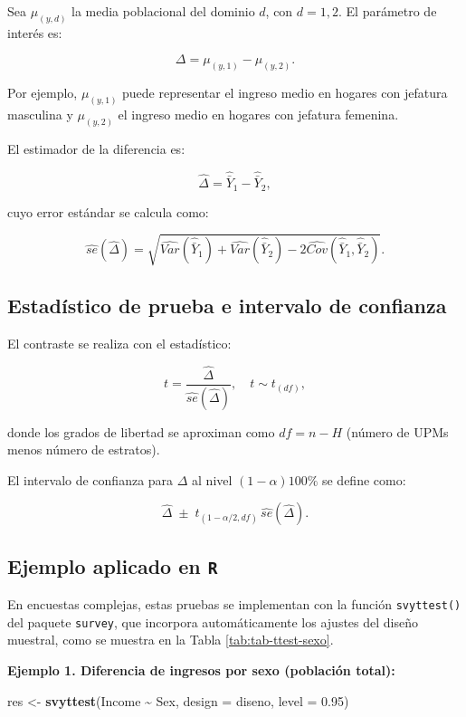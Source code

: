 \documentclass[
  spanish,
  12pt,
]{book}
\newenvironment{Shaded}{\begin{snugshade}}{\end{snugshade}}
\newcommand{\AttributeTok}[1]{\textcolor[rgb]{0.13,0.29,0.53}{#1}}
\newcommand{\FloatTok}[1]{\textcolor[rgb]{0.00,0.00,0.81}{#1}}
\newcommand{\FunctionTok}[1]{\textcolor[rgb]{0.13,0.29,0.53}{\textbf{#1}}}
\newcommand{\NormalTok}[1]{#1}
\newcommand{\OtherTok}[1]{\textcolor[rgb]{0.56,0.35,0.01}{#1}}
\newcommand{\SpecialCharTok}[1]{\textcolor[rgb]{0.81,0.36,0.00}{\textbf{#1}}}
\begin{document}
Sea \(\mu_{(y,d)}\) la media poblacional del dominio \(d\), con \(d=1,2\). El parámetro de interés es:

\[
\Delta = \mu_{(y,1)} - \mu_{(y,2)}.
\]

Por ejemplo, \(\mu_{(y,1)}\) puede representar el ingreso medio en hogares con jefatura masculina y \(\mu_{(y,2)}\) el ingreso medio en hogares con jefatura femenina.

El estimador de la diferencia es:

\[
\hat{\Delta} = \hat{\bar{Y}}_1 - \hat{\bar{Y}}_2,
\]

cuyo error estándar se calcula como:

\[
\hat{se}(\hat{\Delta}) = \sqrt{ \hat{Var}(\hat{\bar{Y}}_1) + \hat{Var}(\hat{\bar{Y}}_2) - 2 \hat{Cov}(\hat{\bar{Y}}_1, \hat{\bar{Y}}_2)}.
\]

\subsection{Estadístico de prueba e intervalo de confianza}\label{estaduxedstico-de-prueba-e-intervalo-de-confianza}

El contraste se realiza con el estadístico:

\[
t = \frac{\hat{\Delta}}{\hat{se}(\hat{\Delta})}, \quad t \sim t_{(df)},
\]

donde los grados de libertad se aproximan como \(df = n - H\) (número de UPMs menos número de estratos).

El intervalo de confianza para \(\Delta\) al nivel \((1-\alpha)100\%\) se define como:

\[
\hat{\Delta} \;\pm\; t_{(1-\alpha/2,df)} \, \hat{se}(\hat{\Delta}).
\]

\subsection{\texorpdfstring{Ejemplo aplicado en \texttt{R}}{Ejemplo aplicado en R}}\label{ejemplo-aplicado-en-r}

En encuestas complejas, estas pruebas se implementan con la función \texttt{svyttest()} del paquete \texttt{survey}, que incorpora automáticamente los ajustes del diseño muestral, como se muestra en la Tabla \ref{tab:tab-ttest-sexo}.

\textbf{Ejemplo 1. Diferencia de ingresos por sexo (población total):}

\begin{Shaded}
\begin{Highlighting}[]
\NormalTok{res }\OtherTok{\textless{}{-}} \FunctionTok{svyttest}\NormalTok{(Income }\SpecialCharTok{\textasciitilde{}}\NormalTok{ Sex, }\AttributeTok{design =}\NormalTok{ diseno, }\AttributeTok{level =} \FloatTok{0.95}\NormalTok{)}
\end{Highlighting}
\end{Shaded}
\end{document}
